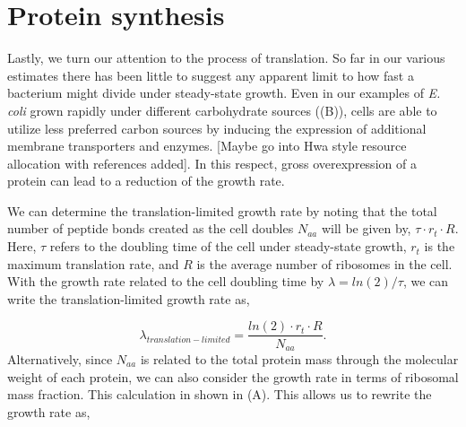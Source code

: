 \section{Protein synthesis}

Lastly, we turn our attention to the process of translation. So far in our
various estimates there has been little to suggest any apparent limit to how
fast a bacterium might divide under steady-state growth. Even in our examples of
\textit{E. coli} grown rapidly under different carbohydrate sources
((B)),  cells are able to utilize less preferred carbon
sources by inducing the expression of additional membrane transporters and
enzymes. [Maybe go into Hwa style resource allocation with references added]. In
this respect, gross overexpression of a protein can lead to a reduction of the
growth rate.

We can determine the translation-limited growth rate by noting that the total
number of peptide bonds created as the cell doubles $N_{aa}$ will be given by,
$\tau \cdot r_t \cdot R$. Here, $\tau$ refers to the doubling time of the cell
under steady-state growth, $r_t$ is the maximum translation rate, and $R$ is the
average number of ribosomes in the cell. With the growth rate related to the
cell doubling time by $\lambda = ln(2)/\tau$, we can write the
translation-limited growth rate as,

\begin{equation}
\lambda_{translation-limited} = \frac{ln(2) \cdot r_t \cdot R}{N_{aa}}.
\end{equation}
Alternatively, since $N_{aa}$ is related to the total protein mass through the
molecular weight of each protein, we can also consider the growth rate in terms
of ribosomal mass fraction. This calculation in shown in (A).
This allows us to rewrite the growth rate as,

%

